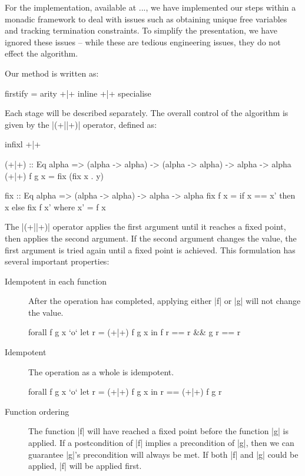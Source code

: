 \documentclass[preprint]{sigplanconf}
\begin{document}
For the implementation, available at ..., we have implemented our steps within a monadic framework to deal with issues such as obtaining unique free variables and tracking termination constraints. To simplify the presentation, we have ignored these issues -- while these are tedious engineering issues, they do not effect the algorithm.

Our method is written as:

\begin{code}
firstify = arity +|+ inline +|+ specialise
\end{code}

Each stage will be described separately. The overall control of the algorithm is given by the |(+||+)| operator, defined as:

\begin{code}
infixl +|+

(+|+) :: Eq alpha => (alpha -> alpha) -> (alpha -> alpha) -> alpha -> alpha
(+|+) f g x  = fix (fix x . y)

fix :: Eq alpha => (alpha -> alpha) -> alpha -> alpha
fix f x = if x == x' then x else fix f x'
    where x' = f x
\end{code}

The |(+||+)| operator applies the first argument until it reaches a fixed point, then applies the second argument. If the second argument changes the value, the first argument is tried again until a fixed point is achieved. This formulation has several important properties:

\begin{description}
\item[Idempotent in each function] After the operation has completed, applying either |f| or |g| will not change the value.

\begin{code}
forall f g x `o` let r = (+|+) f g x in f r == r && g r == r
\end{code}

\item[Idempotent] The operation as a whole is idempotent.

\begin{code}
forall f g x `o` let r = (+|+) f g x in r == (+|+) f g r
\end{code}

\item[Function ordering] The function |f| will have reached a fixed point before the function |g| is applied. If a postcondition of |f| implies a precondition of |g|, then we can guarantee |g|'s precondition will always be met. If both |f| and |g| could be applied, |f| will be applied first.
\end{description}
\end{document}
